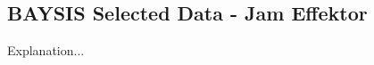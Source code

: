 \begin{appendices}
    
    \tocless\section{BAYSIS Selected Data - Jam Effektor}
    \label{appendix_baysis_selected_duringJam}
    
    Explanation...
    
    
    
    

\end{appendices}
